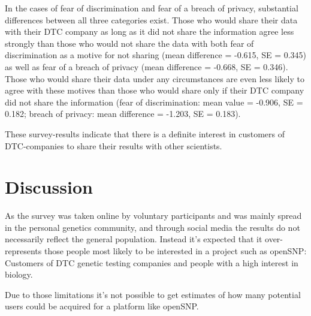 \documentclass[10pt]{article}
\begin{document}
In the cases of fear of discrimination and fear of a breach of privacy, substantial differences between all three categories exist. Those who would share their data with their DTC company as long as it did not share the information agree less strongly than those who would not share the data with both fear of discrimination as a motive for not sharing (mean difference = -0.615, SE = 0.345) as well as fear of a breach of privacy (mean difference = -0.668, SE = 0.346). Those who would share their data under any circumstances are even less likely to agree with these motives than those who would share only if their DTC company did not share the information (fear of discrimination: mean value = -0.906, SE = 0.182; breach of privacy: mean difference = -1.203, SE = 0.183).

These survey-results indicate that there is a definite interest in customers of DTC-companies to share their results with other scientists. 

\section*{Discussion}
As the survey was taken online by voluntary participants and was mainly spread in the personal genetics community,
and through social media the results do not necessarily reflect the general population. 
Instead it's expected that it over-represents those people most likely to be interested in a project such as openSNP: 
Customers of DTC genetic testing companies and people with a high interest in biology. 

Due to those limitations it's not possible to get estimates of how many potential users could be acquired for a platform like openSNP. 
\end{document}
